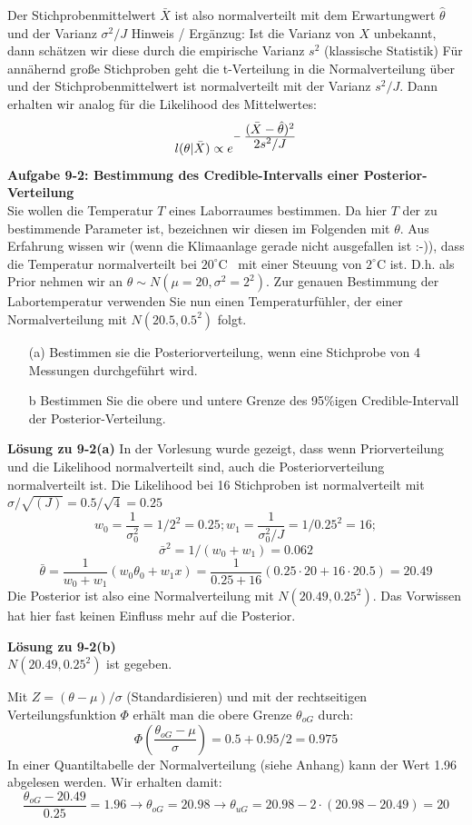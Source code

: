 Der Stichprobenmittelwert $\bar{X}$ ist also normalverteilt mit dem 
Erwartungwert $\hat{\theta}$ und der Varianz $\sigma^2 /J$
Hinweis / Ergänzug: Ist die Varianz von $X$ unbekannt, dann schätzen wir diese durch die empirische Varianz $s^2$ (klassische Statistik) Für annähernd große Stichproben geht die t-Verteilung in
die Normalverteilung über und der Stichprobenmittelwert ist normalverteilt mit der Varianz $s^2/J$. Dann erhalten wir analog für die Likelihood des Mittelwertes: 
\[
l(\theta|\bar{X}) \propto e^{-\;\frac{\textstyle (\bar{X} - \hat{\theta})^2} 
	{\textstyle 2 s^2/J}}
\]
\textbf{Aufgabe 9-2: Bestimmung des Credible-Intervalls einer Posterior-Verteilung} \\
Sie wollen die Temperatur $T$ eines Laborraumes bestimmen. 
Da hier $T$ der zu bestimmende Parameter ist, bezeichnen 
wir diesen im Folgenden mit $\theta$.
Aus Erfahrung wissen wir (wenn die Klimaanlage gerade nicht ausgefallen ist :-)), dass die Temperatur normalverteilt bei $20^{\circ}\textrm{C}$ \ 
 mit einer Steuung von $2^{\circ}\textrm{C}$ ist. D.h. als Prior nehmen wir an 
$\theta \sim N(\mu=20,\sigma^2=2^2)$. Zur genauen Bestimmung der 
Labortemperatur verwenden Sie nun einen Temperaturfühler, der einer 
Normalverteilung mit $N(20.5,0.5^2)$ folgt. 

\begin{itemize}
   \item[(a)] Bestimmen sie die Posteriorverteilung, wenn eine 
   Stichprobe von 4 Messungen durchgeführt wird.
   \item[b] Bestimmen Sie die obere und untere Grenze des 95\%igen Credible-Intervall der Posterior-Verteilung.
\end{itemize}

\textbf{Lösung zu 9-2(a)}
In der Vorlesung wurde gezeigt, dass wenn Priorverteilung und 
die Likelihood normalverteilt sind, auch die Posteriorverteilung 
normalverteilt ist. 
Die Likelihood bei 16 Stichproben ist normalverteilt mit 
$\sigma/\sqrt{(J)} = 0.5 / \sqrt{4} = 0.25 $
\[
w_0 = \frac{1}{\sigma_0^2} = 1/2^2 = 0.25; 
w_1 = \frac{1}{\sigma_0^2/J} = 1/0.25^2 = 16;
\]
\[
\bar{\sigma}^2 = 1/(w_0 + w_1) = 0.062
\]
\[
\bar{\theta} = \frac{1}{w_0 + w_1} (w_0\theta_0 + w_1 x) = 
\frac{1}{0.25 + 16} (0.25 \cdot 20 + 16 \cdot 20.5) = 20.49
\]
Die Posterior ist also eine Normalverteilung mit $N(20.49,0.25^2)$.
Das Vorwissen hat hier fast keinen Einfluss mehr auf die Posterior.

\textbf{Lösung zu 9-2(b)} \\
$N(20.49,0.25^2)$ ist gegeben. 

Mit $Z=(\theta - \mu)/ \sigma$ (Standardisieren) und mit der rechtseitigen Verteilungsfunktion $\Phi$  
erhält man die obere Grenze $\theta_{oG}$ durch:
\[
\Phi\left(\frac{\theta_{oG}-\mu}{\sigma}\right) = 0.5 + 0.95/2 = 0.975   
\]
In einer Quantiltabelle der Normalverteilung (siehe Anhang) kann der Wert 1.96 abgelesen werden.
Wir erhalten damit: 
\[
\frac{\theta_{oG}-20.49}{0.25} = 1.96 \rightarrow \theta_{oG} = 20.98 
\rightarrow \theta_{uG} = 20.98 - 2 \cdot (20.98-20.49) = 20
\]

